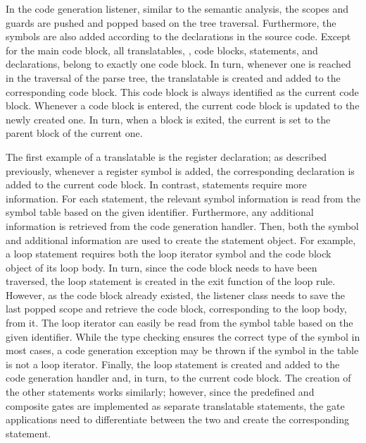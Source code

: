 In the code generation listener, similar to the semantic analysis, the scopes and guards are pushed and popped based on the tree traversal. Furthermore, the symbols are also added according to the declarations in the source code. Except for the main code block, all translatables, \ie, code blocks, statements, and declarations, belong to exactly one code block. In turn, whenever one is reached in the traversal of the parse tree, the translatable is created and added to the corresponding code block. This code block is always identified as the current code block. Whenever a code block is entered, the current code block is updated to the newly created one. In turn, when a block is exited, the current is set to the parent block of the current one.

The first example of a translatable is the register declaration; as described previously, whenever a register symbol is added, the corresponding declaration is added to the current code block. In contrast, statements require more information. For each statement, the relevant symbol information is read from the symbol table based on the given identifier. Furthermore, any additional information is retrieved from the code generation handler. Then, both the symbol and additional information are used to create the statement object. For example, a loop statement requires both the loop iterator symbol and the code block object of its loop body. In turn, since the code block needs to have been traversed, the loop statement is created in the exit function of the loop rule. However, as the code block already existed, the listener class needs to save the last popped scope and retrieve the code block, corresponding to the loop body, from it. The loop iterator can easily be read from the symbol table based on the given identifier. While the type checking ensures the correct type of the symbol in most cases, a code generation exception may be thrown if the symbol in the table is not a loop iterator. Finally, the loop statement is created and added to the code generation handler and, in turn, to the current code block. The creation of the other statements works similarly; however, since the predefined and composite gates are implemented as separate translatable statements, the gate applications need to differentiate between the two and create the corresponding statement.

